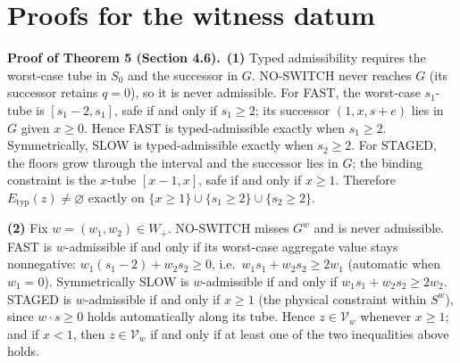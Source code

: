 \documentclass[3p,11pt]{elsarticle}
\begin{document}
\section{Proofs for the witness datum}

\textbf{Proof of Theorem 5 (Section 4.6).}\ \textbf{(1)} Typed admissibility requires the worst-case
tube in \(S_0\) and the successor in \(G\). NO-SWITCH never reaches
\(G\) (its successor retains \(q = 0\)), so it is never admissible. For
FAST, the worst-case \(s_1\)-tube is \([s_1 - 2, s_1]\), safe if and
only if \(s_1 \ge 2\); its successor \((1, x, s + e)\) lies in \(G\)
given \(x \ge 0\). Hence FAST is typed-admissible exactly when
\(s_1 \ge 2\). Symmetrically, SLOW is typed-admissible exactly when
\(s_2 \ge 2\). For STAGED, the floors grow through the interval and the
successor lies in \(G\); the binding constraint is the \(x\)-tube
\([x - 1, x]\), safe if and only if \(x \ge 1\). Therefore
\(E_{\mathrm{typ}}(z) \neq \varnothing\) exactly on
\(\{x \ge 1\} \cup \{s_1 \ge 2\} \cup \{s_2 \ge 2\}\).

\textbf{(2)} Fix \(w = (w_1, w_2) \in W_+\). NO-SWITCH misses \(G^w\)
and is never admissible. FAST is \(w\)-admissible if and only if its
worst-case aggregate value stays nonnegative:
\(w_1(s_1 - 2) + w_2 s_2 \ge 0\), i.e.~\(w_1 s_1 + w_2 s_2 \ge 2 w_1\)
(automatic when \(w_1 = 0\)). Symmetrically SLOW is \(w\)-admissible if
and only if \(w_1 s_1 + w_2 s_2 \ge 2 w_2\). STAGED is \(w\)-admissible
if and only if \(x \ge 1\) (the physical constraint within \(S^w\)),
since \(w \cdot s \ge 0\) holds automatically along its tube. Hence
\(z \in \mathcal{V}_w\) whenever \(x \ge 1\); and if \(x < 1\), then
\(z \in \mathcal{V}_w\) if and only if at least one of the two
inequalities above holds.
\end{document}
